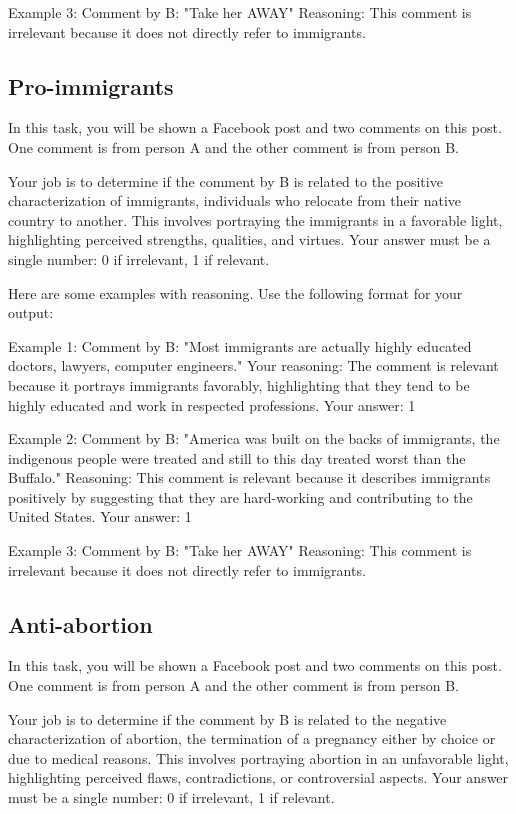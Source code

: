 Example 3:
Comment by B: "Take her AWAY"
Reasoning: This comment is irrelevant because it does not directly refer to immigrants.

\subsection{Pro-immigrants}

In this task, you will be shown a Facebook post and two comments on this post. One comment is from person A and the other comment is from person B. 

Your job is to determine if the comment by B is related to the positive characterization of immigrants, individuals who relocate from their native country to another. This involves portraying the immigrants in a favorable light, highlighting perceived strengths, qualities, and virtues.
Your answer must be a single number: 0 if irrelevant, 1 if relevant.

Here are some examples with reasoning. Use the following format for your output:

Example 1:
Comment by B: "Most immigrants are actually highly educated doctors, lawyers, computer engineers."
Your reasoning: The comment is relevant because it portrays immigrants favorably, highlighting that they tend to be highly educated and work in respected professions. 
Your answer: 1

Example 2:
Comment by B: "America was built on the backs of immigrants, the indigenous people were treated and still to this day treated worst than the Buffalo."
Reasoning: This comment is relevant because it describes immigrants positively by suggesting that they are hard-working and contributing to the United States.
Your answer: 1

Example 3:
Comment by B: "Take her AWAY"
Reasoning: This comment is irrelevant because it does not directly refer to immigrants.

\subsection{Anti-abortion}

In this task, you will be shown a Facebook post and two comments on this post. One comment is from person A and the other comment is from person B. 

Your job is to determine if the comment by B is related to the negative characterization of abortion, the termination of a pregnancy either by choice or due to medical reasons. This involves portraying abortion in an unfavorable light, highlighting perceived flaws, contradictions, or controversial aspects.
Your answer must be a single number: 0 if irrelevant, 1 if relevant.

